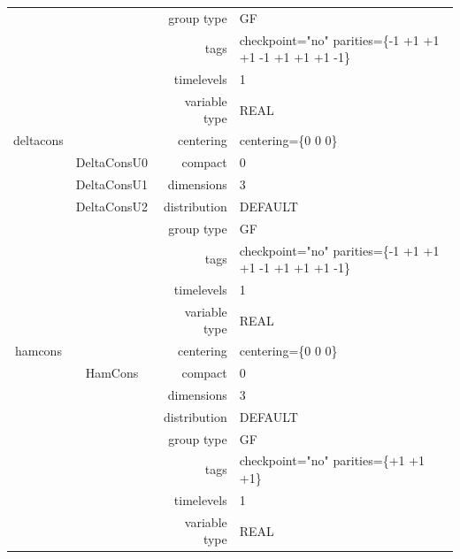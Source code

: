 \documentclass{article}
\begin{document}
\begin{tabular*}{150mm}{|c|c@{\extracolsep{\fill}}|rl|}
 &  & group type & GF \\ 
 &  & tags & checkpoint="no" parities=\{-1 +1 +1  +1 -1 +1  +1 +1 -1\} \\ 
 &  & timelevels & 1 \\ 
 &  & variable type & REAL \\ 
\hline 
deltacons &  & centering & centering=\{0 0 0\} \\ 
 & DeltaConsU0 & compact & 0 \\ 
 & DeltaConsU1 & dimensions & 3 \\ 
 & DeltaConsU2 & distribution & DEFAULT \\ 
 &  & group type & GF \\ 
 &  & tags & checkpoint="no" parities=\{-1 +1 +1  +1 -1 +1  +1 +1 -1\} \\ 
 &  & timelevels & 1 \\ 
 &  & variable type & REAL \\ 
\hline 
hamcons &  & centering & centering=\{0 0 0\} \\ 
 & HamCons & compact & 0 \\ 
 &  & dimensions & 3 \\ 
 &  & distribution & DEFAULT \\ 
 &  & group type & GF \\ 
 &  & tags & checkpoint="no" parities=\{+1 +1 +1\} \\ 
 &  & timelevels & 1 \\ 
 &  & variable type & REAL \\ 
\hline 
\end{tabular*} 



\vspace{5mm}
\vspace{5mm}
\end{document}

